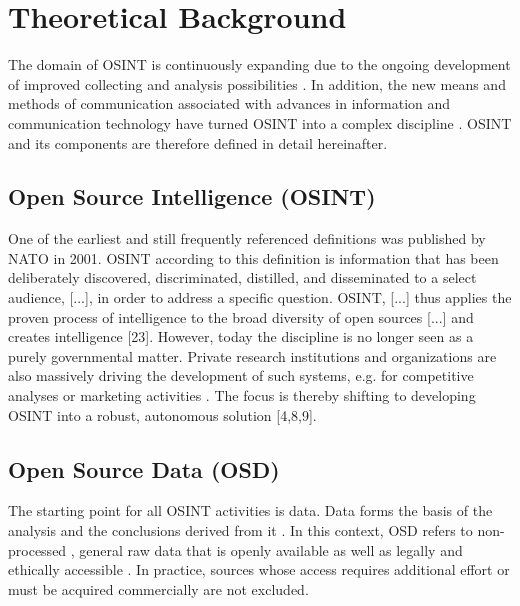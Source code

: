 \documentclass[10pt]{article}
\begin{document}
\section{Theoretical Background}
The domain of OSINT is continuously expanding due to the ongoing development of improved
collecting and analysis possibilities \cite{AlKilani.2021, Ghioni.2023, Williams.2018}. In
addition, the new means and methods of communication associated with advances in information
and communication technology have turned OSINT into a complex discipline
\cite{AlKilani.2021, Benes.2013, Chen.2012, Williams.2018}. OSINT and its
components are therefore defined in detail hereinafter.

\subsection{Open Source Intelligence (OSINT)}

One of the earliest and still frequently referenced definitions \cite{DosPassos.2017}
was published by NATO in 2001. OSINT according to this definition is information that has been
deliberately discovered, discriminated, distilled, and disseminated to a select audience,
[...], in order to address a specific question. OSINT, [...] thus applies the proven
process of intelligence to the broad diversity of open sources [...] and creates
intelligence [23]. However, today the discipline is no longer seen as a purely governmental
matter. Private research institutions and organizations \cite{Bohm.2021,Mercado.2005} are
also massively driving the development of such systems, e.g. for competitive analyses or marketing activities
\cite{AlKilani.2021, Dokman.2020,Ghioni.2023}. The focus is thereby shifting to
developing OSINT into a robust, autonomous solution [4,8,9].

\subsection{Open Source Data (OSD)}

The starting point for all OSINT activities is data. Data forms the basis of the
analysis and the conclusions derived from it \cite{Gibson.2016}. In this context, OSD
refers to non-processed \cite{DosPassos.2017}, general raw data that is openly available
\cite{Burke.2007} as well as legally and ethically accessible
\cite{Schaurer.2010, NorthAtlanticTreatyOrganization.2001}. In practice, sources whose
access requires additional effort \cite{Bohm.2021} or must be acquired commercially
\cite{Williams.2018,NorthAtlanticTreatyOrganization.2001,JointChiefsofStaffU.S.Army.2013}
are not excluded.
\end{document}
